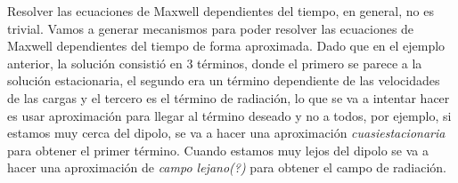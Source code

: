 %
%
%
%
\indent Resolver las ecuaciones de Maxwell dependientes del tiempo, en general, no es trivial. Vamos a generar mecanismos para poder resolver las ecuaciones de Maxwell dependientes del tiempo de forma aproximada. Dado que en el ejemplo anterior, la solución consistió en $3$ términos, donde el primero se parece a la solución estacionaria, el segundo era un término dependiente de las velocidades de las cargas y el tercero es el término de radiación, lo que se va a intentar hacer es usar aproximación para llegar al término deseado y no a todos, por ejemplo, si estamos muy cerca del dipolo, se va a hacer una aproximación \textit{cuasiestacionaria} para obtener el primer término. Cuando estamos muy lejos del dipolo se va a hacer una aproximación de \textit{campo lejano(?)} para obtener el campo de radiación.\\




